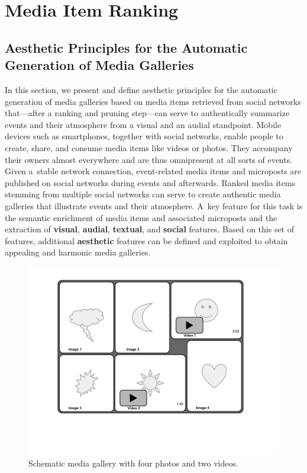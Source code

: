 \chapter{Media Item Ranking}
\label{sec:media-item-ranking}

\ifpdf
    \graphicspath{{7_media_item_ranking/figures/PNG/}{7_media_item_ranking/figures/PDF/}{7_media_item_ranking/figures/}}
\else
    \graphicspath{{7_media_item_ranking/figures/EPS/}{7_media_item_ranking/figures/}}
\fi


\section{Aesthetic Principles for the Automatic Generation of Media Galleries}
In this section, we present and define aesthetic principles
for the automatic generation of media galleries
based on media items retrieved from social networks
that---after a ranking and pruning step---can serve to authentically
summarize events and their atmosphere from a visual
and an audial standpoint.
Mobile devices such as smartphones, together with social networks,
enable people to create, share, and consume media items
like videos or photos.
They accompany their owners almost everywhere
and are thus omnipresent at all sorts of events.
Given a~stable network connection, event-related media items
and microposts are published on social networks
during events and afterwards.
Ranked media items stemming from multiple social networks
can serve to create authentic media galleries
that illustrate events and their atmosphere.
A~key feature for this task is the semantic enrichment
of media items and associated microposts
and the extraction of \textbf{visual}, \textbf{audial},
\textbf{textual}, and \textbf{social} features.
Based on this set of features,
additional \textbf{aesthetic} features
can be defined and exploited to obtain appealing
and harmonic media galleries.

\begin{figure}[htb]
\centering
\includegraphics[trim=20mm 40mm 20mm 10mm, clip, width=0.75\columnwidth]{media-gallery.pdf}
\caption{Schematic media gallery with four photos and two videos.}
\label{fig:media-gallery}
\end{figure}

